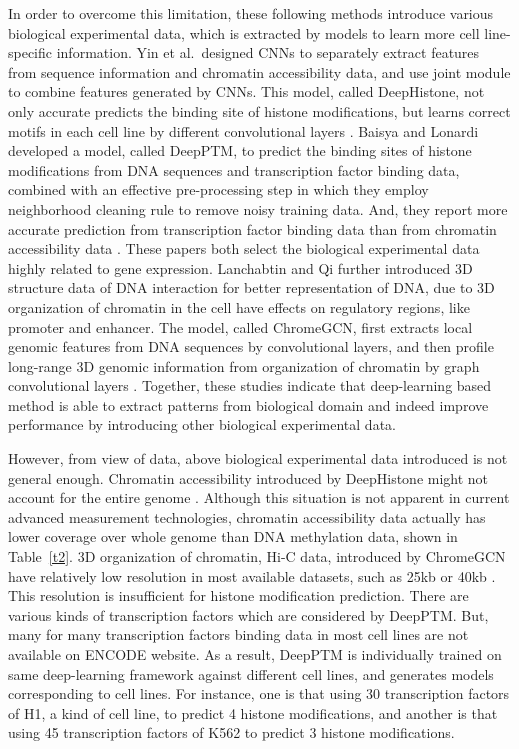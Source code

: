 In order to overcome this limitation, these following methods introduce various biological experimental data, which is extracted by models to learn more cell line-specific information. Yin et al.\ designed CNNs to separately extract features from sequence information and chromatin accessibility data, and use joint module to combine features generated by CNNs. This model, called DeepHistone, not only accurate predicts the binding site of histone modifications, but learns correct motifs in each cell line by different convolutional layers \cite{yin2019deephistone}. Baisya and Lonardi developed a model, called DeepPTM, to predict the binding sites of histone modifications from DNA sequences and transcription factor binding data, combined with an effective pre-processing step in which they employ neighborhood cleaning rule to remove noisy training data. And, they report more accurate prediction from transcription factor binding data than from chromatin accessibility data \cite{baisya2020prediction}. These papers both select the biological experimental data highly related to gene expression. Lanchabtin and Qi further introduced 3D structure data of DNA interaction for better representation of DNA, due to 3D organization of chromatin in the cell have effects on regulatory regions, like promoter and enhancer. The model, called ChromeGCN, first extracts local genomic features from DNA sequences by convolutional layers, and then profile long-range 3D genomic information from organization of chromatin by graph convolutional layers \cite{lanchantin2020graph}.  Together, these studies indicate that deep-learning based method is able to extract patterns from biological domain and indeed improve performance by introducing other biological experimental data.

However, from view of data, above biological experimental data introduced is not general enough. Chromatin accessibility introduced by DeepHistone might not account for the entire genome \cite{yan2016genome}. Although this situation is not apparent in current advanced measurement technologies, chromatin accessibility data actually has lower coverage over whole genome than DNA methylation data, shown in Table~\ref{t2}. 3D organization of chromatin, Hi-C data, introduced by ChromeGCN have relatively low resolution in most available datasets, such as 25kb or 40kb \cite{zhang2018enhancing}.  This resolution is insufficient for histone modification prediction. There are various kinds of transcription factors which are considered by DeepPTM. But, many for many transcription factors binding data in most cell lines are not available on ENCODE website. As a result, DeepPTM is individually trained on same deep-learning framework against different cell lines, and generates models corresponding to cell lines. For instance, one is that using 30 transcription factors of H1, a kind of cell line, to predict 4 histone modifications, and another is that using 45 transcription factors of K562 to predict 3 histone modifications.


